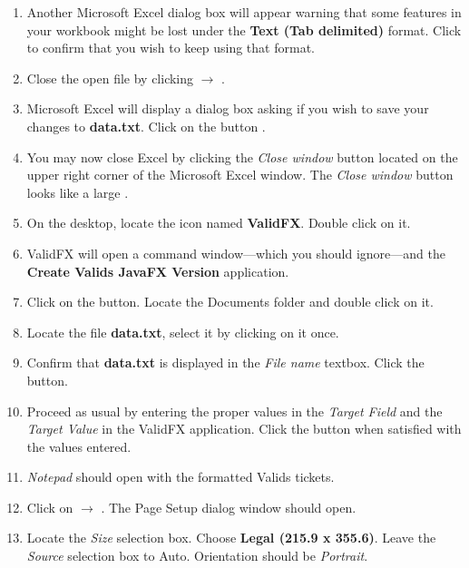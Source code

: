 \documentclass[12pt]{article}
\begin{document}
\begin{enumerate}
\item Another Microsoft Excel dialog box will appear warning 
that some features in your workbook might be lost
under the {\bf Text (Tab delimited)} format. Click  to confirm that 
you wish to keep using that format.

\item  Close the open file by clicking   $\longrightarrow$ .

\item  Microsoft Excel will display a dialog box asking if you wish to save your changes to 
{\bf data.txt}.
Click on the button .

\item You may now close Excel by clicking 
the {\sl Close window} button located on the upper right corner of the
Microsoft Excel window. The {\sl Close window} button looks like a large .

\item On the desktop, locate the icon named {\bf ValidFX}. Double click on it.

\item ValidFX will open a command window---which you should ignore---and 
the {\bf Create Valids JavaFX Version}
application.

\item Click on the  button. Locate the Documents folder and double click on it.

\item Locate the file {\bf data.txt}, select it by clicking on it once.

\item Confirm that {\bf data.txt} is displayed in the {\sl File name} textbox. 
Click the  button.

\item Proceed as usual by entering the proper values in the {\sl Target Field} 
and the {\sl Target Value} in the ValidFX
application. Click the  button when satisfied with the values entered.

\item {\sl Notepad} should open with the formatted Valids tickets.

\item Click on   $\longrightarrow$ . The Page Setup dialog window should open.

\item Locate the {\sl Size} selection box. Choose {\bf Legal (215.9 x 355.6)}. 
Leave the {\sl Source} selection box
to Auto. Orientation should be {\sl Portrait}.


\end{enumerate}
\end{document}
